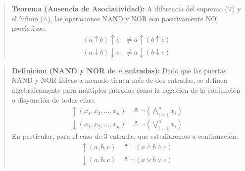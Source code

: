 \begin{quote}\textbf{Teorema (Ausencia de Asociatividad):}\label{no_asoc_deriv}
A diferencia del supremo ($\vee$) y el ínfimo ($\wedge$), las operaciones NAND y NOR son positivamente NO asociativas:
\begin{align*}
    (a \uparrow b) \uparrow c &\neq a \uparrow (b \uparrow c) \\
    (a \downarrow b) \downarrow c &\neq a \downarrow (b \downarrow c)
\end{align*}
\end{quote}

\begin{quote}\textbf{Definicion (NAND y NOR de $n$ entradas):}\label{def_n_entradas}
Dado que las puertas NAND y NOR físicas a menudo tienen más de dos entradas, se definen algebraicamente para múltiples entradas como la negación de la conjunción o disyunción de todas ellas:
\begin{align*}
    \uparrow(x_1, x_2, \dots, x_n) &\triangleq \neg \left( \bigwedge_{i=1}^n x_i \right) \\
    \downarrow(x_1, x_2, \dots, x_n) &\triangleq \neg \left( \bigvee_{i=1}^n x_i \right)
\end{align*}
En particular, para el caso de 3 entradas que estudiaremos a continuación:
\begin{align*}
    \uparrow(a,b,c) &\triangleq \neg(a \wedge b \wedge c) \\
    \downarrow(a,b,c) &\triangleq \neg(a \vee b \vee c)
\end{align*}
\end{quote}


